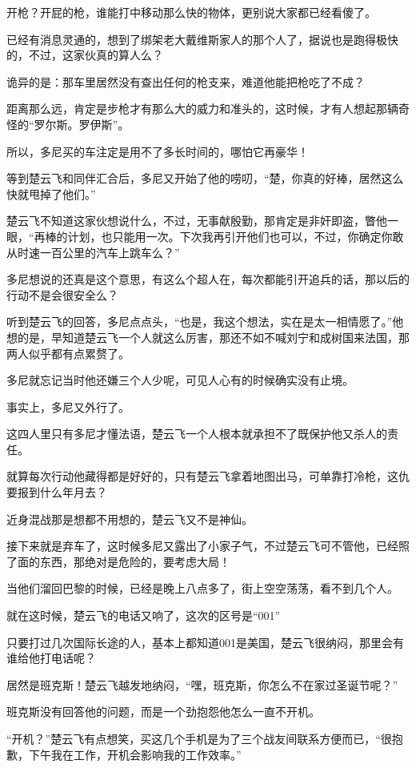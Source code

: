 开枪？开屁的枪，谁能打中移动那么快的物体，更别说大家都已经看傻了。

已经有消息灵通的，想到了绑架老大戴维斯家人的那个人了，据说也是跑得极快的，不过，这家伙真的算人么？

诡异的是：那车里居然没有查出任何的枪支来，难道他能把枪吃了不成？

距离那么远，肯定是步枪才有那么大的威力和准头的，这时候，才有人想起那辆奇怪的“罗尔斯。罗伊斯”。

所以，多尼买的车注定是用不了多长时间的，哪怕它再豪华！

等到楚云飞和同伴汇合后，多尼又开始了他的唠叨，“楚，你真的好棒，居然这么快就甩掉了他们。”

楚云飞不知道这家伙想说什么，不过，无事献殷勤，那肯定是非奸即盗，瞥他一眼，“再棒的计划，也只能用一次。下次我再引开他们也可以，不过，你确定你敢从时速一百公里的汽车上跳车么？”

多尼想说的还真是这个意思，有这么个超人在，每次都能引开追兵的话，那以后的行动不是会很安全么？

听到楚云飞的回答，多尼点点头，“也是，我这个想法，实在是太一相情愿了。”他想的是，早知道楚云飞一个人就这么厉害，那还不如不喊刘宁和成树国来法国，那两人似乎都有点累赘了。

多尼就忘记当时他还嫌三个人少呢，可见人心有的时候确实没有止境。

事实上，多尼又外行了。

这四人里只有多尼才懂法语，楚云飞一个人根本就承担不了既保护他又杀人的责任。

就算每次行动他藏得都是好好的，只有楚云飞拿着地图出马，可单靠打冷枪，这仇要报到什么年月去？

近身混战那是想都不用想的，楚云飞又不是神仙。

接下来就是弃车了，这时候多尼又露出了小家子气，不过楚云飞可不管他，已经照了面的东西，那绝对是危险的，要考虑大局！

当他们溜回巴黎的时候，已经是晚上八点多了，街上空空荡荡，看不到几个人。

就在这时候，楚云飞的电话又响了，这次的区号是“001”

只要打过几次国际长途的人，基本上都知道001是美国，楚云飞很纳闷，那里会有谁给他打电话呢？

居然是班克斯！楚云飞越发地纳闷，“嘿，班克斯，你怎么不在家过圣诞节呢？”

班克斯没有回答他的问题，而是一个劲抱怨他怎么一直不开机。

“开机？”楚云飞有点想笑，买这几个手机是为了三个战友间联系方便而已，“很抱歉，下午我在工作，开机会影响我的工作效率。”

